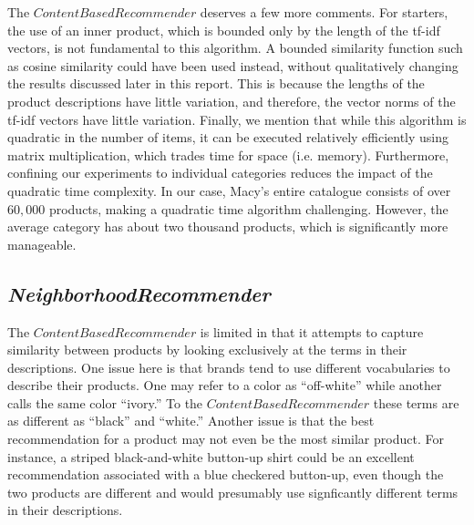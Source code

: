 \documentclass[11pt]{article}
\begin{document}
The $ContentBasedRecommender$ deserves a few more comments. For starters, the
use of an inner product, which is bounded only by the length of the tf-idf
vectors, is not fundamental to this algorithm. A bounded similarity function
such as cosine similarity could have been used instead, without qualitatively
changing the results discussed later in this report. This is because the lengths
of the product descriptions have little variation, and therefore, the vector
norms of the tf-idf vectors have little variation. Finally, we mention that
while this algorithm is quadratic in the number of items, it can be executed
relatively efficiently using matrix multiplication, which trades time for space
(i.e.  memory). Furthermore, confining our experiments to individual categories
reduces the impact of the quadratic time complexity. In our case, Macy's entire
catalogue consists of over $60,000$ products, making a quadratic time algorithm
challenging. However, the average category has about two thousand products,
which is significantly more manageable.

\subsection*{\em NeighborhoodRecommender}
The $ContentBasedRecommender$ is limited in that it attempts to capture
similarity between products by looking exclusively at the terms in their
descriptions. One issue here is that brands tend to use different vocabularies
to describe their products. One may refer to a color as ``off-white'' while
another calls the same color ``ivory.'' To the $ContentBasedRecommender$ these
terms are as different as ``black'' and ``white.'' Another issue is that the
best recommendation for a product may not even be the most similar product. For
instance, a striped black-and-white button-up shirt could be an excellent
recommendation associated with a blue checkered button-up, even though the two
products are different and would presumably use signficantly different terms in
their descriptions.
\end{document}

